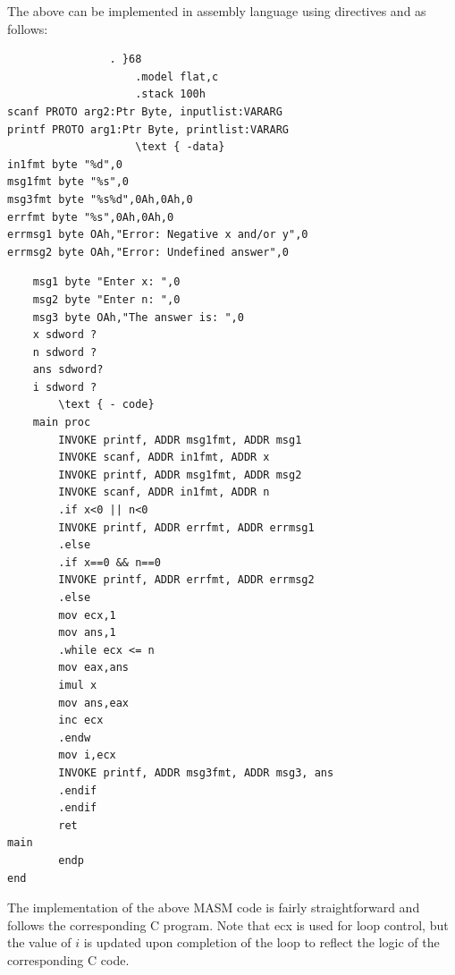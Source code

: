 \documentclass[10pt]{book}
\begin{document}
The above can be implemented in assembly language using directives and as follows:

\begin{verbatim}
                . }68
                    .model flat,c
                    .stack 100h
scanf PROTO arg2:Ptr Byte, inputlist:VARARG
printf PROTO arg1:Ptr Byte, printlist:VARARG
                    \text { -data}
in1fmt byte "%d",0
msg1fmt byte "%s",0
msg3fmt byte "%s%d",0Ah,0Ah,0
errfmt byte "%s",0Ah,0Ah,0
errmsg1 byte OAh,"Error: Negative x and/or y",0
errmsg2 byte OAh,"Error: Undefined answer",0
\end{verbatim}

\begin{verbatim}
    msg1 byte "Enter x: ",0
    msg2 byte "Enter n: ",0
    msg3 byte OAh,"The answer is: ",0
    x sdword ?
    n sdword ?
    ans sdword?
    i sdword ?
        \text { - code}
    main proc
        INVOKE printf, ADDR msg1fmt, ADDR msg1
        INVOKE scanf, ADDR in1fmt, ADDR x
        INVOKE printf, ADDR msg1fmt, ADDR msg2
        INVOKE scanf, ADDR in1fmt, ADDR n
        .if x<0 || n<0
        INVOKE printf, ADDR errfmt, ADDR errmsg1
        .else
        .if x==0 && n==0
        INVOKE printf, ADDR errfmt, ADDR errmsg2
        .else
        mov ecx,1
        mov ans,1
        .while ecx <= n
        mov eax,ans
        imul x
        mov ans,eax
        inc ecx
        .endw
        mov i,ecx
        INVOKE printf, ADDR msg3fmt, ADDR msg3, ans
        .endif
        .endif
        ret
main
        endp
end
\end{verbatim}

The implementation of the above MASM code is fairly straightforward and follows the corresponding C program. Note that ecx is used for loop control, but the value of $i$ is updated upon completion of the loop to reflect the logic of the corresponding C code.
\end{document}
